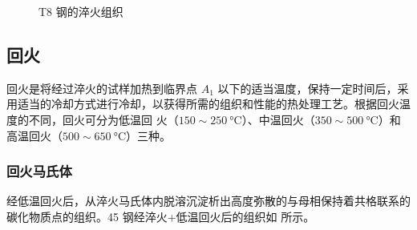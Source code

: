             \begin{figure}[!ht]
                \centering
                \hspace{20pt}
                \hspace{20pt}
                \caption{T8 钢的淬火组织\label{fig:A4.2}}
            \end{figure}
    \subsection{回火}
        回火是将经过淬火的试样加热到临界点 $A_1$ 以下的适当温度，保持一定时间后，采用适当的冷却方式进行冷却，以获得所需的组织和性能的热处理工艺。根据回火温度的不同，回火可分为低温回
        火（$150 \sim 250~\unit{\degreeCelsius}$）、中温回火（$350 \sim 500~\unit{\degreeCelsius}$）和高温回火（$500 \sim 650~\unit{\degreeCelsius}$）三种。
            \subsubsection{回火马氏体}
                经低温回火后，从淬火马氏体内脱溶沉淀析出高度弥散的与母相保持着共格联系的碳化物质点的组织。45 钢经淬火+低温回火后的组织如 所示。
